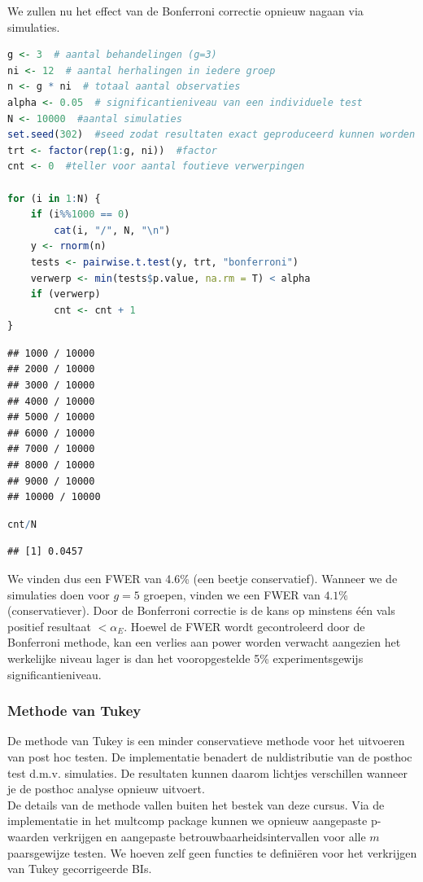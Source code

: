 \documentclass[
  12pt,dutch,coursenotes]{book}
\theoremstyle{definition}
\theoremstyle{definition}
\theoremstyle{definition}
\theoremstyle{definition}
\theoremstyle{remark}
\begin{document}
We zullen nu het effect van de Bonferroni correctie opnieuw nagaan via simulaties.

\begin{lstlisting}[language=R]
g <- 3  # aantal behandelingen (g=3)
ni <- 12  # aantal herhalingen in iedere groep
n <- g * ni  # totaal aantal observaties
alpha <- 0.05  # significantieniveau van een individuele test
N <- 10000  #aantal simulaties
set.seed(302)  #seed zodat resultaten exact geproduceerd kunnen worden
trt <- factor(rep(1:g, ni))  #factor
cnt <- 0  #teller voor aantal foutieve verwerpingen

for (i in 1:N) {
    if (i%%1000 == 0)
        cat(i, "/", N, "\n")
    y <- rnorm(n)
    tests <- pairwise.t.test(y, trt, "bonferroni")
    verwerp <- min(tests$p.value, na.rm = T) < alpha
    if (verwerp)
        cnt <- cnt + 1
}
\end{lstlisting}

\begin{lstlisting}
## 1000 / 10000 
## 2000 / 10000 
## 3000 / 10000 
## 4000 / 10000 
## 5000 / 10000 
## 6000 / 10000 
## 7000 / 10000 
## 8000 / 10000 
## 9000 / 10000 
## 10000 / 10000
\end{lstlisting}

\begin{lstlisting}[language=R]
cnt/N
\end{lstlisting}

\begin{lstlisting}
## [1] 0.0457
\end{lstlisting}

We vinden dus een FWER van 4.6\% (een beetje conservatief). Wanneer we de simulaties doen voor \(g=5\) groepen, vinden we een FWER van \(4.1\%\) (conservatiever). Door de Bonferroni correctie is de kans op minstens één vals positief resultaat \(< \alpha_E\). Hoewel de FWER wordt gecontroleerd door de Bonferroni methode, kan een verlies aan power worden verwacht aangezien het werkelijke niveau lager is dan het vooropgestelde 5\% experimentsgewijs significantieniveau.

\hypertarget{methode-van-tukey}{%
\subsubsection{Methode van Tukey}\label{methode-van-tukey}}

De methode van Tukey is een minder conservatieve methode voor het uitvoeren van post hoc testen.
De implementatie benadert de nuldistributie van de posthoc test d.m.v. simulaties.
De resultaten kunnen daarom lichtjes verschillen wanneer je de posthoc analyse opnieuw uitvoert.\\
De details van de methode vallen buiten het bestek van deze cursus.
Via de implementatie in het multcomp package kunnen we opnieuw aangepaste p-waarden verkrijgen en aangepaste betrouwbaarheidsintervallen voor alle \(m\) paarsgewijze testen.
We hoeven zelf geen functies te definiëren voor het verkrijgen van Tukey gecorrigeerde BIs.
\end{document}
